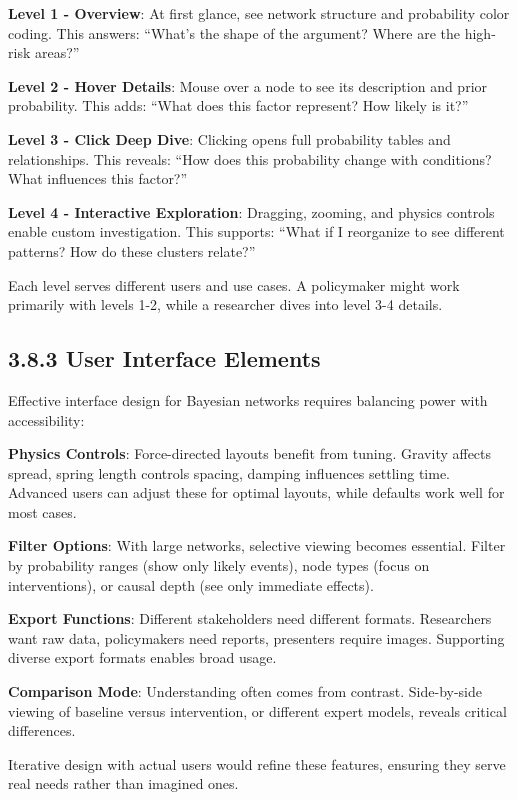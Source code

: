 \documentclass[
  11pt,
  letterpaper,
  openany]{book}
\begin{document}
\textbf{Level 1 - Overview}: At first glance, see network structure and
probability color coding. This answers: ``What's the shape of the
argument? Where are the high-risk areas?''

\textbf{Level 2 - Hover Details}: Mouse over a node to see its
description and prior probability. This adds: ``What does this factor
represent? How likely is it?''

\textbf{Level 3 - Click Deep Dive}: Clicking opens full probability
tables and relationships. This reveals: ``How does this probability
change with conditions? What influences this factor?''

\textbf{Level 4 - Interactive Exploration}: Dragging, zooming, and
physics controls enable custom investigation. This supports: ``What if I
reorganize to see different patterns? How do these clusters relate?''

Each level serves different users and use cases. A policymaker might
work primarily with levels 1-2, while a researcher dives into level 3-4
details.

\subsection{3.8.3 User Interface Elements}\label{sec-ui-elements}

Effective interface design for Bayesian networks requires balancing
power with accessibility:

\textbf{Physics Controls}: Force-directed layouts benefit from tuning.
Gravity affects spread, spring length controls spacing, damping
influences settling time. Advanced users can adjust these for optimal
layouts, while defaults work well for most cases.

\textbf{Filter Options}: With large networks, selective viewing becomes
essential. Filter by probability ranges (show only likely events), node
types (focus on interventions), or causal depth (see only immediate
effects).

\textbf{Export Functions}: Different stakeholders need different
formats. Researchers want raw data, policymakers need reports,
presenters require images. Supporting diverse export formats enables
broad usage.

\textbf{Comparison Mode}: Understanding often comes from contrast.
Side-by-side viewing of baseline versus intervention, or different
expert models, reveals critical differences.

Iterative design with actual users would refine these features, ensuring
they serve real needs rather than imagined ones.
\end{document}
